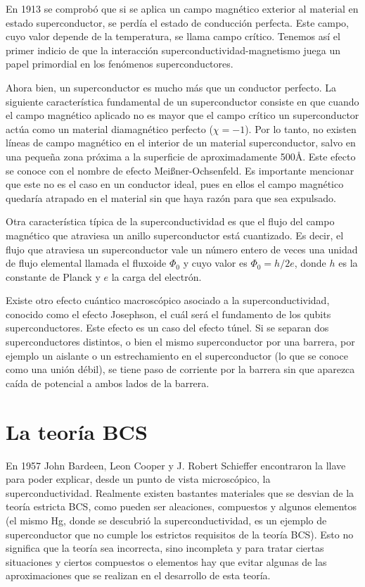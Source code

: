 En 1913 \cite{Tinkham_1996} se comprobó que si se aplica un campo magnético exterior al material en estado superconductor, se perdía el estado de conducción perfecta. Este campo, cuyo valor depende de la temperatura, se llama campo crítico. Tenemos así el primer indicio de que la interacción superconductividad-magnetismo juega un papel primordial en los fenómenos superconductores.

Ahora bien, un superconductor es mucho más que un conductor perfecto. La siguiente característica fundamental de un superconductor consiste en que cuando el campo magnético aplicado no es mayor que el campo  crítico un superconductor actúa como un material diamagnético perfecto ($\chi = -1$). Por lo tanto, no existen líneas de campo magnético en el interior de un material superconductor, salvo en una pequeña zona próxima a la superficie de aproximadamente 500Å. Este efecto se conoce con el nombre de efecto Meißner-Ochsenfeld. Es importante mencionar que este no es el caso en un conductor ideal, pues en ellos el campo magnético quedaría atrapado en el material sin que haya razón para que sea expulsado.

Otra característica típica de la superconductividad es que el flujo del campo magnético que atraviesa un anillo superconductor está cuantizado. Es decir, el flujo que atraviesa un superconductor vale un número entero de veces una unidad de flujo elemental llamada el fluxoide $\Phi_0$ y cuyo valor es $\Phi_0 = h /2 e$, donde $h$ es la constante de Planck y $e$ la carga del electrón.

Existe otro efecto cuántico macroscópico asociado a la superconductividad, conocido como el efecto Josephson, el cuál será el fundamento de los qubits superconductores. Este efecto es un caso del efecto túnel. Si se separan dos superconductores distintos, o bien el mismo superconductor por una barrera, por ejemplo un aislante o un estrechamiento en el superconductor (lo que se conoce como una unión débil), se tiene paso de corriente por la barrera sin que aparezca caída de potencial a ambos lados de la barrera.


\section{La teoría BCS}

En 1957 John Bardeen, Leon Cooper y J. Robert Schieffer \cite{bcs} encontraron la llave para poder explicar, desde un punto de vista microscópico, la superconductividad. Realmente existen bastantes materiales que se desvian de la teoría estricta BCS, como pueden ser aleaciones, compuestos y algunos elementos (el mismo Hg, donde se descubrió la superconductividad, es un ejemplo de superconductor que no cumple los estrictos requisitos de la teoría BCS). Esto no significa que la teoría sea incorrecta, sino incompleta y para tratar ciertas situaciones y ciertos compuestos o elementos hay que evitar algunas de las aproximaciones que se realizan en el desarrollo de esta teoría.

